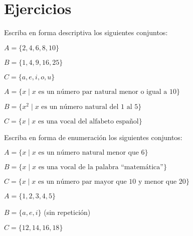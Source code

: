 
\section{Ejercicios}

\begin{exercise}
	\problem Escriba en forma descriptiva los siguientes conjuntos:
	
	\begin{exerciselist}
		\item $A = \{2, 4, 6, 8, 10\}$
		\item $B = \{1, 4, 9, 16, 25\}$
		\item $C = \{a, e, i, o, u\}$
	\end{exerciselist}
	
	\begin{solucion}
		\begin{exerciselist}
			\item $A = \{x \mid x \text{ es un número par natural menor o igual a 10}\}$
			\item $B = \{x^2 \mid x \text{ es un número natural del 1 al 5}\}$
			\item $C = \{x \mid x \text{ es una vocal del alfabeto español}\}$
		\end{exerciselist}
	\end{solucion}
\end{exercise}

\begin{exercise}
\problem Escriba en forma de enumeración los siguientes conjuntos:

\begin{exerciselist}
    \item $A = \{x \mid x \text{ es un número natural menor que 6}\}$
    \item $B = \{x \mid x \text{ es una vocal de la palabra ``matemática''}\}$
    \item $C = \{x \mid x \text{ es un número par mayor que 10 y menor que 20}\}$
\end{exerciselist}

\begin{solucion}
\begin{exerciselist}
    \item $A = \{1, 2, 3, 4, 5\}$
    \item $B = \{a, e, i\}$ (sin repetición)
    \item $C = \{12, 14, 16, 18\}$
\end{exerciselist}
\end{solucion}
\end{exercise}

